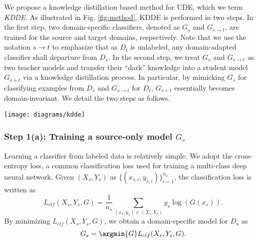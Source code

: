 We propose a knowledge distillation based method for UDE, which we term \textit{KDDE}. As illustrated in Fig. \ref{fig:method}, KDDE is performed in two steps. In the first step, two domain-specific classifiers, denoted as $G_s$ and $G_{s\rightarrow t}$, are trained for the source and target domains, respectively. Note that we use the notation $s\rightarrow t$ to emphasize that as $D_t$ is unlabeled, any domain-adapted classifier shall departure from $D_s$. In the second step, we treat $G_s$ and $G_{s\rightarrow t}$ as two teacher models and transfer their ``dark'' knowledge into a student model $G_{s+t}$ via a knowledge distillation process. In particular, by mimicking $G_s$ for classifying examples from $D_s$ and $G_{s\rightarrow t}$ for $D_t$, $G_{s+t}$ essentially becomes domain-invariant.  We detail the two steps as follows.


\begin{figure*}[tbh!]
\setlength{\abovecaptionskip}{5pt}
\centering
\texttt{[image: diagrams/kdde]}
\caption{\textbf{Conceptual diagram of the proposed KDDE method for UDE}. KDDE is run in two steps. First, a model $G_s$ is trained on the \textit{labeled} source domain by standard supervised learning, while another model $G_{s\rightarrow t}$ for the \textit{unlabeled} target domain is trained by unsupervised domain adaptation (here CDAN~\cite{nips18-cdan} as a running example). Then, knowledge distillation is performed to transfer ``dark'' knowledge from the two domain-specific models into a student model $G_{s+t}$ to make it applicable to both domains.}
\label{fig:method}
\end{figure*} 

\subsubsection{Step 1(a): Training a source-only model $G_s$}

Learning a classifier from labeled data is relatively simple. We adopt the cross-entropy loss, a common classification loss used for training a multi-class deep neural network. Given $(X_s,Y_s)$ as $\{(x_{s,i}, y_{s,i})\}_{i=1}^{n_s}$, the classification loss is written as
\begin{equation} \label{eq:clf-loss}
L_{clf}(X_s, Y_s, G) = \frac{1}{n_s} \sum_{(x_s,y_s)\in (X_s,Y_s)} y_s \log (G(x_s)).
\end{equation} 
By minimizing $L_{clf}(X_s, Y_s, G)$, we obtain a domain-specific model for $D_s$ as
\begin{equation} \label{eq:g_s}
G_s = \argmin{G}  L_{clf}(X_s, Y_s, G).
\end{equation}




